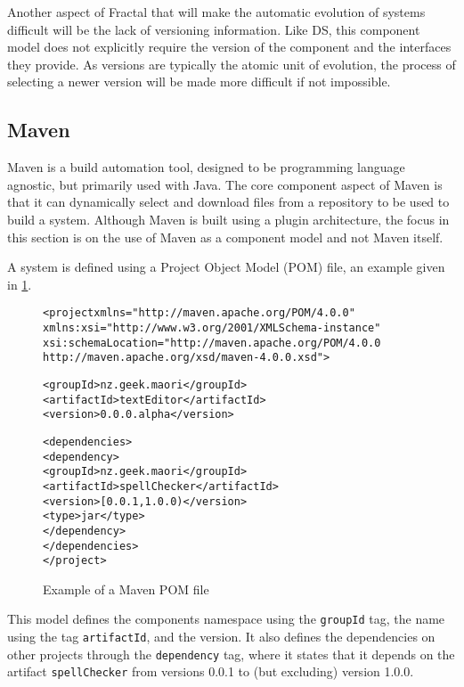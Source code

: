 Another aspect of Fractal that will make the automatic evolution of systems difficult will be the lack of versioning information.
Like DS, this component model does not explicitly require the version of the component and the interfaces they provide.
As versions are typically the atomic unit of evolution, the process of selecting a newer version will be made more difficult if not impossible. 

\subsection{Maven}
Maven is a build automation tool, designed to be programming language agnostic, but primarily used with Java.
The core component aspect of Maven is that it can dynamically select and download files from a repository to be used to build a system.
Although Maven is built using a plugin architecture, the focus in this section is on the use of Maven as a component model and not Maven itself.

A system is defined using a Project Object Model (POM) file, an example given in \ref{mavenmetadata}. 

\begin{figure}[htp]
\begin{center}
\begin{alltt}
<project xmlns="http://maven.apache.org/POM/4.0.0"
  xmlns:xsi="http://www.w3.org/2001/XMLSchema-instance"
  xsi:schemaLocation="http://maven.apache.org/POM/4.0.0
                      http://maven.apache.org/xsd/maven-4.0.0.xsd">

  <groupId>nz.geek.maori</groupId>
  <artifactId>textEditor</artifactId>
  <version>0.0.0.alpha</version>

  <dependencies>
    <dependency>
      <groupId>nz.geek.maori</groupId>
      <artifactId>spellChecker</artifactId>
      <version>[0.0.1,1.0.0)</version>
      <type>jar</type>
     </dependency>
  </dependencies>
</project>
\end{alltt}
  \caption[Maven POM file]{Example of a Maven POM file}
  \label{mavenmetadata}
\end{center}
\end{figure}

This model defines the components namespace using the \verb+groupId+ tag, the name using the tag \verb+artifactId+, and the version.
It also defines the dependencies on other projects through the \verb+dependency+ tag,
where it states that it depends on the artifact \verb+spellChecker+ from versions 0.0.1 to (but excluding) version 1.0.0.

